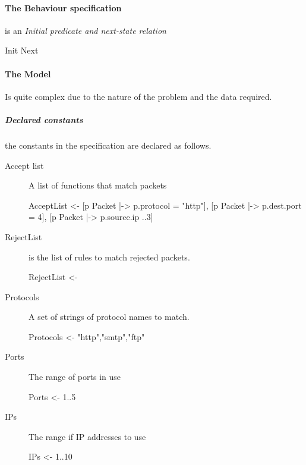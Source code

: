 \documentclass[12pt]{article}
\begin{document}
\paragraph{The Behaviour specification} is an \emph{Initial predicate and
next-state relation}
\begin{tla}
	Init
	Next
\end{tla}
\begin{tlatex}
%
%
\end{tlatex}

\paragraph{The Model} Is quite complex due to the nature of the problem and
the data required.
\subparagraph{Declared constants} the constants in the specification are
declared as follows.
\begin{description}
\item[Accept list] A list of functions that match packets
\begin{tla}
AcceptList <- {
	[p \in Packet |-> p.protocol = "http"],
	[p \in Packet |-> p.dest.port = 4],
	[p \in Packet |-> p.source.ip ..3]
}
\end{tla}
\begin{tlatex}
%
\@x{ \}}%
\end{tlatex}
\item[RejectList] is the list of rules to match rejected packets.
\begin{tla}
RejectList <- {}
\end{tla}
\begin{tlatex}
%
\end{tlatex}
\item[Protocols] A set of strings of protocol names to match.
\begin{tla}
Protocols <- {"http","smtp","ftp"}
\end{tla}
\begin{tlatex}
%
\end{tlatex}
\item[Ports] The range of ports in use
\begin{tla}
Ports <- 1..5
\end{tla}
\begin{tlatex}
%
\end{tlatex}

\item[IPs] The range if IP addresses to use
\begin{tla}
IPs <- 1..10
\end{tla}
\begin{tlatex}
%
\end{tlatex}

\end{description}
\end{document}
